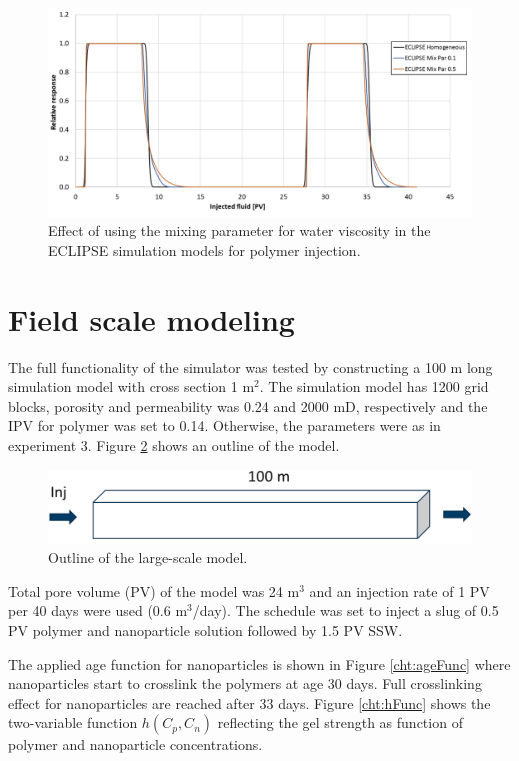 \documentclass[journal = enfuem, manuscript =  article]{achemso}
\begin{document}
\begin{figure}
    \centering
    \includegraphics[width=\textwidth]{fig/simEclMix.png}
    \caption{Effect of using the mixing parameter for water viscosity in the ECLIPSE simulation models for polymer injection. }
    \label{cht:simEclMix}
\end{figure}

\section{Field scale modeling}
The full functionality of the simulator was tested by constructing a 100 m long simulation model with cross section 1 m$^2$. The simulation model has 1200 grid blocks, porosity and permeability was 0.24 and 2000 mD, respectively and the  IPV for polymer was set to 0.14. Otherwise, the parameters were as in experiment 3. Figure \ref{fig:largeScaleModel} shows an outline of the model.
\begin{figure}[h]
    \centering
    \includegraphics[width=\textwidth]{fig/largeScaleModel.png}
    \caption{Outline of the large-scale model. }
    \label{fig:largeScaleModel}
\end{figure}

Total pore volume (PV) of the model was 24 m$^3$ and an injection rate of 1 PV per 40 days were used (0.6 m$^3$/day). The schedule was set to inject a slug of 0.5 PV polymer and nanoparticle solution followed by 1.5 PV SSW. 

The applied age function for nanoparticles is shown in Figure \ref{cht:ageFunc} where nanoparticles start to crosslink the polymers at age 30 days. Full crosslinking effect for nanoparticles are reached after 33 days. Figure \ref{cht:hFunc} shows the two-variable function $h(C_p,C_n)$  reflecting the gel strength as function of polymer and nanoparticle concentrations.      
\end{document}
